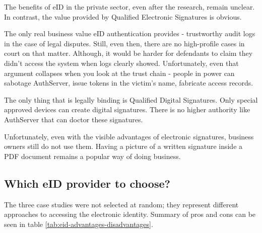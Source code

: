 The benefits of eID in the private sector, even after the research, remain unclear. In contrast, the value provided by Qualified Electronic Signatures is obvious.

The only real business value eID authentication provides - trustworthy audit logs in the case of legal disputes. Still, even then, there are no high-profile cases in court on that matter. Although, it would be harder for defendants to claim they didn't access the system when logs clearly showed. Unfortunately, even that argument collapses when you look at the trust chain - people in power can sabotage AuthServer, issue tokens in the victim's name, fabricate access records.

The only thing that is legally binding is Qualified Digital Signatures. Only special approved devices can create digital signatures. There is no higher authority like AuthServer that can doctor these signatures.

Unfortunately, even with the visible advantages of electronic signatures, business owners still do not use them. Having a picture of a written signature inside a PDF document remains a popular way of doing business.

\subsection{Which eID provider to choose?}

The three case studies were not selected at random; they represent different approaches to accessing the electronic identity. Summary of pros and cons can be seen in table \ref{tab:eid-advantages-disadvantages}.

